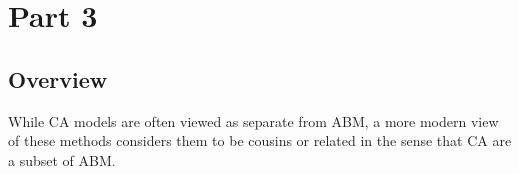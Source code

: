 \documentclass[11pt]{article} %
\begin{document}









\section{Part 3}

\subsection{Overview}

While CA models are often viewed as separate from ABM, a more modern view of these methods considers them to be cousins or related in the sense that CA are a subset of ABM. 
\end{document}
